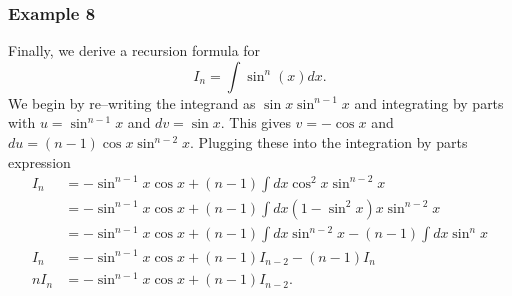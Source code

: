 \documentclass{article}
\begin{document}
\subsubsection*{Example 8}

Finally, we derive a recursion formula for 
\begin{equation}
	I_n = \int \sin^n (x) dx .
\end{equation}
We begin by re--writing the integrand as $\sin x \sin^{n-1} x$ and integrating by parts with $u = \sin^{n-1} x$ and $dv = \sin x$.
This gives $v = -\cos x$ and $du = (n-1) \cos x \sin^{n-2} x$.
Plugging these into the integration by parts expression
\begin{align*}
	I_n &= -\sin^{n-1} x \cos x + (n-1) \int dx \cos^2 x \sin^{n-2} x \\
	&= -\sin^{n-1} x \cos x + (n-1) \int dx (1- \sin^2 x) x \sin^{n-2} x \\
	&= -\sin^{n-1} x \cos x + (n-1) \int dx \sin^{n-2} x - (n-1) \int dx \sin^n x \\
	I_n &= -\sin^{n-1} x \cos x + (n-1) I_{n-2} - (n-1) I_n \\
	n I_n &= -\sin^{n-1} x \cos x + (n-1) I_{n-2} .
\end{align*}
\end{document}
